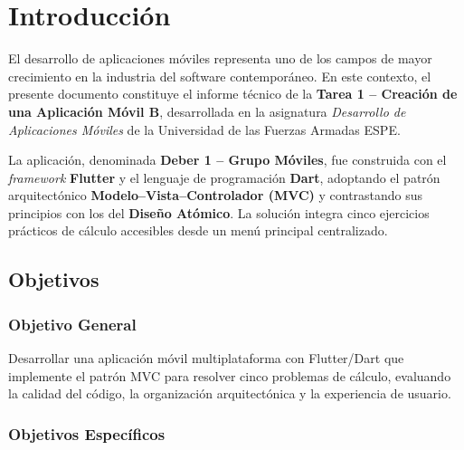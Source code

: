 \documentclass[12pt,a4paper]{article}
\begin{document}
\listoffigures

\listofalgorithms
{}


\newpage
{}
\setcounter{page}{1}

\section{Introducción}

El desarrollo de aplicaciones móviles representa uno de los campos de mayor crecimiento en la industria del software contemporáneo. En este contexto, el presente documento constituye el informe técnico de la \textbf{Tarea 1 -- Creación de una Aplicación Móvil B}, desarrollada en la asignatura \textit{Desarrollo de Aplicaciones Móviles} de la Universidad de las Fuerzas Armadas ESPE.

La aplicación, denominada \textbf{Deber 1 -- Grupo Móviles}, fue construida con el \textit{framework} \textbf{Flutter} y el lenguaje de programación \textbf{Dart}, adoptando el patrón arquitectónico \textbf{Modelo--Vista--Controlador (MVC)} y contrastando sus principios con los del \textbf{Diseño Atómico}. La solución integra cinco ejercicios prácticos de cálculo accesibles desde un menú principal centralizado.

\subsection{Objetivos}

\subsubsection{Objetivo General}

Desarrollar una aplicación móvil multiplataforma con Flutter/Dart que implemente el patrón MVC para resolver cinco problemas de cálculo, evaluando la calidad del código, la organización arquitectónica y la experiencia de usuario.

\subsubsection{Objetivos Específicos}
\end{document}
